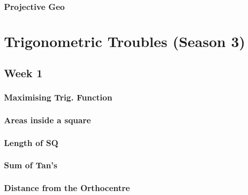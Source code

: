 \documentclass[titlepage=true]{scrartcl}
\begin{document}
        \subsubsection{Projective Geo}
            \label{2-2-7}
            
        \newpage 

\section{Trigonometric Troubles (Season 3)}

    \subsection{Week 1}
        
        \subsubsection{Maximising Trig. Function}
            \label{3-1-1}
            
        \newpage
        
        \subsubsection{Areas inside a square}
            \label{3-1-2}
            
        \newpage
        
        \subsubsection{Length of SQ}
            \label{3-1-3}
            
        \newpage
                
        \subsubsection{Sum of Tan's}
            \label{3-1-4}
            
        \newpage
        
        \subsubsection{Distance from the Orthocentre}
            \label{3-1-5}
            
        \newpage 
        
\end{document}
